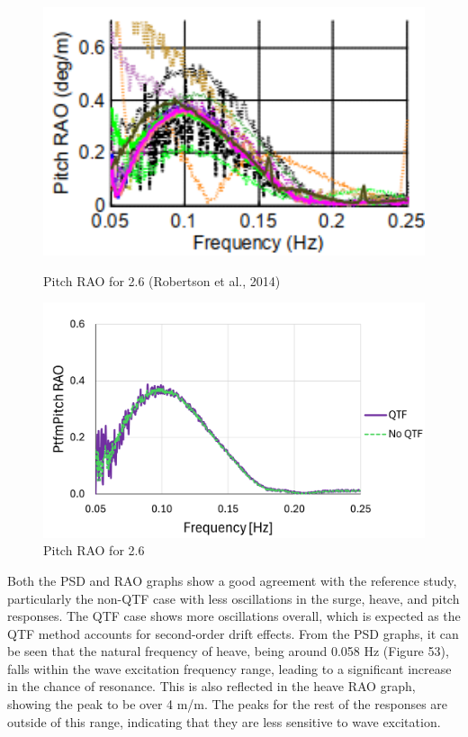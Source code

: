 \documentclass[a4paper, 11pt]{article}
\begin{document}
\begin{figure}[H]
    \begin{minipage}{0.48\textwidth}
        \centering
        \includegraphics[width=1\textwidth]{2.6_pitch.png}
        \caption{\small Pitch RAO for 2.6 (Robertson et al., 2014)}
        \label{fig:2.6_pitch}
    \end{minipage}
    \hfill
    \begin{minipage}{0.5\textwidth}
        \centering
        \includegraphics[width=1\textwidth]{2.6_pitch_mine.png}
        \caption{\small Pitch RAO for 2.6}
        \label{fig:2.6_pitch_mine}
    \end{minipage}
\end{figure}

Both the PSD and RAO graphs show a good agreement with the reference study, particularly the non-QTF case with less oscillations in the surge, heave, and pitch responses. The QTF case shows more oscillations overall, which is expected as the QTF method accounts for second-order drift effects. From the PSD graphs, it can be seen that the natural frequency of heave, being around 0.058 Hz (Figure 53), falls within the wave excitation frequency range, leading to a significant increase in the chance of resonance. This is also reflected in the heave RAO graph, showing the peak to be over 4 m/m. The peaks for the rest of the responses are outside of this range, indicating that they are less sensitive to wave excitation. 
\end{document}
